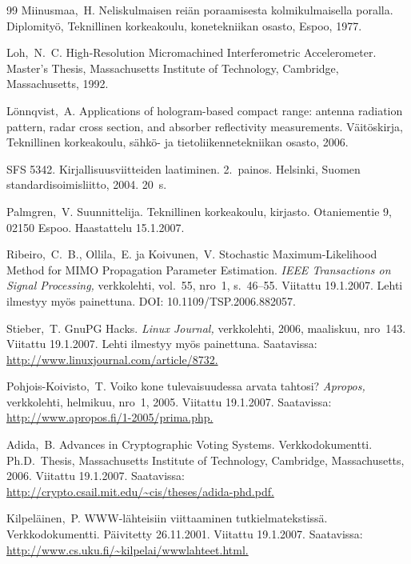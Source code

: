 \documentclass[english,12pt,a4paper,pdftex,elec,utf8]{aaltothesis}
\begin{document}
\begin{thebibliography}{99}
 Miinusmaa,\ H. Neliskulmaisen rei\"an poraamisesta
  kolmikulmaisella poralla. Diplomity\"o, Teknillinen korkeakoulu,
  konetekniikan osasto, Espoo, 1977.

 Loh,\ N.\ C. High-Resolution Micromachined
  Interferometric Accelerometer. Master's Thesis, Massachusetts
  Institute of Technology, Cambridge,
  Massachusetts, 1992.

 L\"onnqvist,\ A.
  Applications of hologram-based compact
    range: antenna radiation pattern, radar cross section, and
    absorber reflectivity measurements.
  V\"ait\"oskirja, Teknillinen korkeakoulu, s\"ahk\"o- ja tietoliikennetekniikan
  osasto, 2006.

 SFS 5342. Kirjallisuusviitteiden laatiminen. 2.\ painos.
  Helsinki, Suomen standardisoimisliitto, 2004. 20~s.

 Palmgren,\ V. Suunnittelija. Teknillinen
  korkeakoulu, kirjasto. Otaniementie 9, 02150 Espoo. Haastattelu
  15.1.2007.

 Ribeiro,\ C.\ B., Ollila,\ E. ja Koivunen,\ V.
  Stochastic Maximum-Likelihood Method for
    MIMO Propagation Parameter Estimation.
 \textit{IEEE Transactions
    on Signal Processing,} verkkolehti, vol.\ 55, nro~1, s.\ 46--55.
  Viitattu 19.1.2007. Lehti ilmestyy my\"os painettuna. DOI:
  10.1109/TSP.2006.882057.

 Stieber,\ T. GnuPG Hacks. \textit{Linux Journal,}
  verkkolehti, 2006, maaliskuu, nro~143. Viitattu 19.1.2007. Lehti
  ilmestyy my\"os painettuna. Saatavissa:
  \url{http://www.linuxjournal.com/article/8732.}

 Pohjois-Koivisto,\ T. Voiko kone tulevaisuudessa arvata
  tahtosi?  \textit{Apropos,} verkkolehti, helmikuu, nro~1, 2005.
  Viitattu 19.1.2007.  Saatavissa:
  \url{http://www.apropos.fi/1-2005/prima.php.}

 Adida,\ B.  Advances in Cryptographic Voting Systems.
  Verkkodokumentti. Ph.D.\ Thesis, Massachusetts Institute of
  Technology, Cambridge, 
  Massachusetts,
  2006. Viitattu 19.1.2007.  Saatavissa:
  \url{http://crypto.csail.mit.edu/~cis/theses/adida-phd.pdf.}

 Kilpel\"ainen,\ P. WWW-l\"ahteisiin viittaaminen
  tutkielmatekstiss\"a. Verkkodokumentti. P\"aivitetty 26.11.2001.
  Viitattu 19.1.2007. Saatavissa:
  \url{http://www.cs.uku.fi/~kilpelai/wwwlahteet.html.}

\end{thebibliography}
\end{document}
